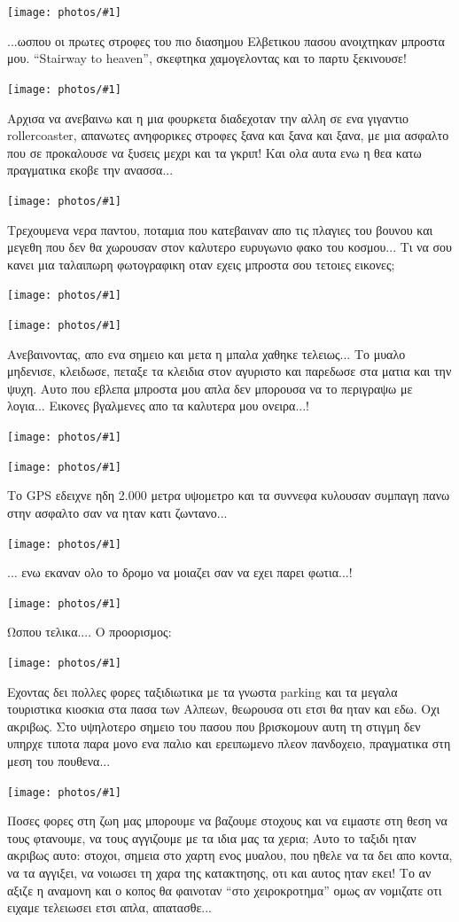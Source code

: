 \documentclass[11pt, letterpaper]{book}
\newcommand\photo[1]{\begin{center}\noindent\texttt{[image: photos/\#1]}\end{center}}
\begin{document}
\photo{45.jpg}

...ωσπου οι πρωτες στροφες του πιο διασημου Ελβετικου πασου ανοιχτηκαν μπροστα μου. 
``Stairway to heaven'', σκεφτηκα χαμογελοντας και το παρτυ ξεκινουσε!

\photo{46.jpg}

Αρχισα να ανεβαινω και η μια φουρκετα διαδεχοταν την αλλη σε ενα γιγαντιο rollercoaster, απανωτες ανηφορικες στροφες ξανα και ξανα και ξανα, με μια ασφαλτο που σε προκαλουσε να ξυσεις μεχρι και τα γκριπ! 
Και ολα αυτα ενω η θεα κατω πραγματικα εκοβε την ανασσα...

\photo{47.jpg}

Τρεχουμενα νερα παντου, ποταμια που κατεβαιναν απο τις πλαγιες του βουνου και μεγεθη που δεν θα χωρουσαν στον καλυτερο ευρυγωνιο φακο του κοσμου... Τι να σου κανει μια ταλαιπωρη φωτογραφικη οταν εχεις μπροστα σου τετοιες εικονες;

\photo{48.jpg}
\photo{49.jpg}

Ανεβαινοντας, απο ενα σημειο και μετα η μπαλα χαθηκε τελειως... Το μυαλο μηδενισε, κλειδωσε, πεταξε τα κλειδια στον αγυριστο και παρεδωσε στα ματια και την ψυχη. 
Αυτο που εβλεπα μπροστα μου απλα δεν μπορουσα να το περιγραψω με λογια... 
Εικονες βγαλμενες απο τα καλυτερα μου ονειρα...!

\photo{50.jpg}
\photo{51.jpg}

Το GPS εδειχνε ηδη 2.000 μετρα υψομετρο και τα συννεφα κυλουσαν συμπαγη πανω στην ασφαλτο σαν να ηταν κατι ζωντανο...

\photo{52.jpg}

... ενω εκαναν ολο το δρομο να μοιαζει σαν να εχει παρει φωτια...!

\photo{53.jpg}

Ωσπου τελικα.... Ο προορισμος:

\photo{54.jpg}

Εχοντας δει πολλες φορες ταξιδιωτικα με τα γνωστα parking και τα μεγαλα τουριστικα κιοσκια στα πασα των Αλπεων, θεωρουσα οτι ετσι θα ηταν και εδω. Οχι ακριβως. Στο υψηλοτερο σημειο του πασου που βρισκομουν αυτη τη στιγμη δεν υπηρχε τιποτα παρα μονο ενα παλιο και ερειπωμενο πλεον πανδοχειο, πραγματικα στη μεση του πουθενα... 

\photo{55.jpg}

Ποσες φορες στη ζωη μας μπορουμε να βαζουμε στοχους και να ειμαστε στη θεση να τους φτανουμε, να τους αγγιζουμε με τα ιδια μας τα χερια; Αυτο το ταξιδι ηταν ακριβως αυτο: στοχοι, σημεια στο χαρτη ενος μυαλου, που ηθελε να τα δει απο κοντα, να τα αγγιξει, να νοιωσει τη χαρα της κατακτησης, οτι και αυτος ηταν εκει! 
Το αν αξιζε η αναμονη και ο κοπος θα φαινοταν ``στο χειροκροτημα'' ομως αν νομιζατε οτι ειχαμε τελειωσει ετσι απλα, απατασθε...
\end{document}
